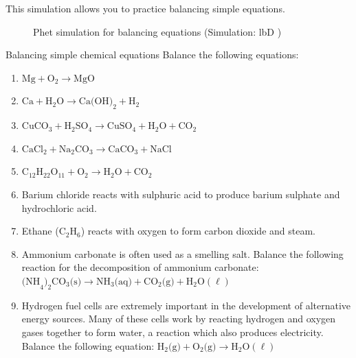     \noindent
This simulation allows you to practice balancing simple equations.
   \setcounter{subfigure}{0}
	\begin{figure}[H] %
    \textnormal{Phet simulation for balancing equations} \nopagebreak
  \label{m38806*phet!!!underscore!!!sim}\label{m38806*phet-simulation}
             { (Simulation:  lbD )}
 \end{figure}       
        \par \label{m38726*secfhsst!!!underscore!!!id763}
            \begin{exercises}{ Balancing simple chemical equations
        }
            \nopagebreak \noindent
 \label{m38726*id65193}Balance the following equations:\par 
 \label{m38726*id65199}\begin{enumerate}[noitemsep, label=\textbf{\arabic*}. ] 
\item  $\text{Mg} + \text{O}_{2} \to \text{MgO}$
\item ${\text{Ca}}+{\text{H}}_{2}\text{O} \to \text{Ca(OH)}_{2} + \text{H}_{2}$
\item ${\text{CuCO}}_{3} + {\text{H}}_{2}{\text{SO}}_{4} \to \text{CuSO}_{4} + {\text{H}}_{2}\text{O} + {\text{CO}}_{2}$
\item $\text{CaCl}_{2} + {\text{Na}}_{2}{\text{CO}}_{3} \to \text{CaCO}_{3} + {\text{NaCl}}$        
\item ${\text{C}}_{12}{\text{H}}_{22}{\text{O}}_{11} + \text{O}_{2} \to \text{H}_{2}\text{O} + \text{CO}_{2}$
\item Barium chloride reacts with sulphuric acid to produce barium sulphate and hydrochloric acid.
\item Ethane (${\text{C}}_{2}{\text{H}}_{6}$) reacts with oxygen to form carbon dioxide and steam.
\item Ammonium carbonate is often used as a smelling salt. Balance the following reaction for the decomposition of ammonium carbonate: ${\text{(NH}}_{4}\text{)}_{2}{\text{CO}}_{3} \text{(s)} \to {\text{NH}}_{3}\text{(aq)} + {\text{CO}}_{2} \text{(g)} + \text{H}_{2}\text{O} (\ell)$ 
\item Hydrogen fuel cells are extremely important in the development of alternative energy sources. Many of these cells work by reacting hydrogen and oxygen gases together to form water, a reaction which also produces electricity. Balance the following equation: $\text{H}_{2} \text{(g)} + \text{O}_{2} \text{(g)} \to \text{H}_{2}\text{O} (\ell)$    

\end{enumerate}
\end{exercises}
